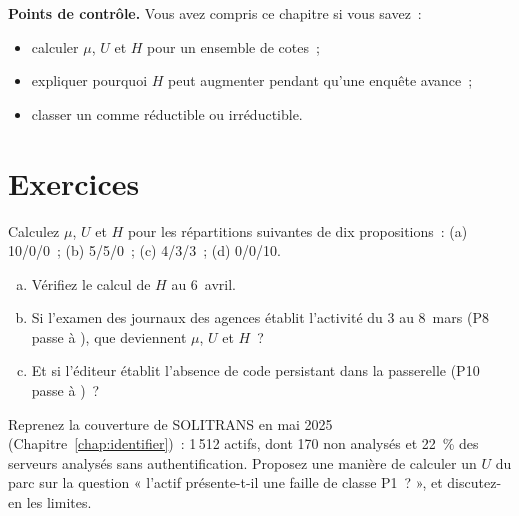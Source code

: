 \begin{boxinfo}
\textbf{Points de contrôle.} Vous avez compris ce chapitre si vous savez~:
\begin{itemize}
    \item calculer $\mu$, $U$ et $H$ pour un ensemble de cotes~;
    \item expliquer pourquoi $H$ peut augmenter pendant qu'une enquête
          avance~;
    \item classer un \NEK{} comme réductible ou irréductible.
\end{itemize}
\end{boxinfo}

\section*{Exercices}

\begin{boxexo}[title={\ding{45}\quad Exercice~16.1. Calculer \niveaubase}]
Calculez $\mu$, $U$ et $H$ pour les répartitions suivantes de dix
propositions~: (a) 10/0/0~; (b) 5/5/0~; (c) 4/3/3~; (d) 0/0/10.
\end{boxexo}

\begin{boxexo}[title={\ding{45}\quad Exercice~16.2. Le 6 avril \niveaumoyen}]
\begin{enumerate}[(a)]
    \item Vérifiez le calcul de $H$ au 6~avril.
    \item Si l'examen des journaux des agences établit l'activité du 3 au
          8~mars (P8 passe à \OUI{}), que deviennent $\mu$, $U$ et $H$~?
    \item Et si l'éditeur établit l'absence de code persistant dans la
          passerelle (P10 passe à \NON{})~?
\end{enumerate}
\end{boxexo}

\begin{boxexo}[title={\ding{45}\quad Exercice~16.3. Le U d'un parc \niveaumoyen}]
Reprenez la couverture de SOLITRANS en mai 2025 (Chapitre~\ref{chap:identifier})~:
1\,512 actifs, dont 170 non analysés et 22~\% des serveurs analysés sans
authentification. Proposez une manière de calculer un $U$ du parc sur la
question « l'actif présente-t-il une faille de classe P1~? », et discutez-en
les limites.
\end{boxexo}

